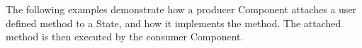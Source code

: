 %


The following examples demonstrate how a producer Component attaches a
user defined method to a State, and how it implements the method. The attached
method is then executed by the consumer Component.
